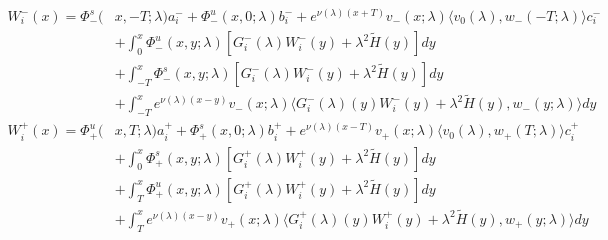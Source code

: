 \documentclass[12pt]{article}
\begin{document}
\begin{align*}
W_i^-(x) = \Phi^s_-(&x, -T; \lambda)a_i^- + \Phi^u_-(x, 0; \lambda)b_i^- + e^{\nu(\lambda)(x+T)} v_-(x; \lambda) \langle v_0(\lambda), w_-(-T; \lambda) \rangle c_i^- \\
&+ \int_0^x \Phi^u_-(x, y; \lambda)[ G_i^-(\lambda)W_i^-(y) + \lambda^2 \tilde{H}(y) ] dy \\
&+ \int_{-T}^x \Phi^s_-(x, y; \lambda) [ G_i^-(\lambda)W_i^-(y) + \lambda^2 \tilde{H}(y) ] dy \\
&+ \int_{-T}^x 
e^{\nu(\lambda)(x-y)} v_-(x; \lambda) \langle G_i^-(\lambda)(y)W_i^-(y) + \lambda^2 \tilde{H}(y), w_-(y; \lambda) \rangle dy \\
W_i^+(x) = \Phi^u_+(&x, T; \lambda)a_i^+ + \Phi^s_+(x, 0; \lambda)b_i^+ + e^{\nu(\lambda)(x - T)} v_+(x; \lambda) \langle v_0(\lambda), w_+(T; \lambda) \rangle c_i^+ \\
&+ \int_0^x \Phi^s_+(x, y; \lambda) [ G_i^+(\lambda)W_i^+(y) + \lambda^2 \tilde{H}(y) ] dy \\
&+ \int_T^x \Phi^u_+(x, y; \lambda) [ G_i^+(\lambda)W_i^+(y) + \lambda^2 \tilde{H}(y) ] dy \\
&+ \int_T^x e^{\nu(\lambda)(x-y)} v_+(x; \lambda) \langle G_i^+(\lambda)(y)W_i^+(y) + \lambda^2 \tilde{H}(y), w_+(y; \lambda) \rangle dy
\end{align*}
\end{document}

